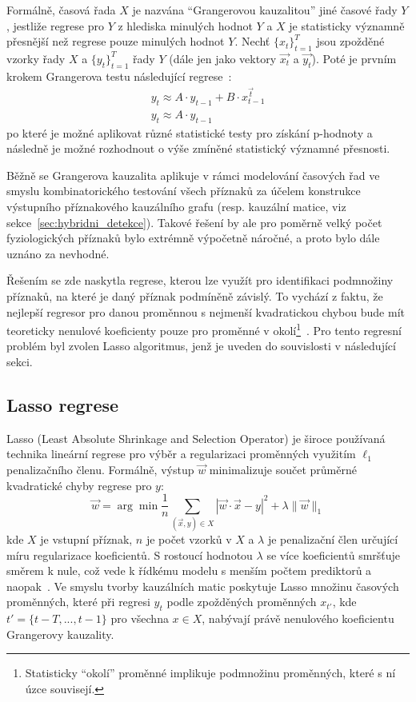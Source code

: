 Formálně, časová řada $X$ je nazvána \enquote{Grangerovou kauzalitou} jiné
časové řady $Y$, jestliže regrese pro $Y$ z hlediska minulých hodnot $Y$ a $X$
je statisticky významně přesnější než regrese pouze minulých hodnot $Y$. Nechť
$\{x_t\}_{t=1}^T$ jsou zpožděné vzorky řady $X$ a $\{y_t\}_{t=1}^T$
řady $Y$ (dále jen jako vektory $\overrightarrow{x_t}$ a $\overrightarrow{y_t}$).
Poté je prvním krokem Grangerova testu následující regrese~\cite{Arnold2007}:
\begin{equation}
    \begin{gathered}
        y_t \approx A \cdot y_{t-1}+B \cdot x_{t-1}^{\vec{t}} \\
        y_t \approx A \cdot y_{t-1}
    \end{gathered}
\end{equation}
po které je možné aplikovat různé statistické testy pro získání p-hodnoty a
následně je možné rozhodnout o výše zmíněné statistický významné přesnosti.

Běžně se Grangerova kauzalita aplikuje v rámci modelování časových řad ve smyslu
kombinatorického testování všech příznaků za účelem konstrukce výstupního
příznakového kauzálního grafu (resp. kauzální matice, viz
sekce~\ref{sec:hybridni_detekce}). Takové řešení by ale pro poměrně velký počet
fyziologických příznaků bylo extrémně výpočetně náročné, a proto bylo dále
uznáno za nevhodné.

Řešením se zde naskytla regrese, kterou lze využít pro identifikaci podmnožiny
příznaků, na které je daný příznak podmíněně závislý. To vychází z faktu, že
nejlepší regresor pro danou proměnnou s nejmenší kvadratickou chybou bude mít
teoreticky nenulové koeficienty pouze pro proměnné v okolí\footnote{Statisticky
    \enquote{okolí} proměnné implikuje podmnožinu proměnných, které s ní úzce
    souvisejí.}~\cite{Schindler2013,Arnold2007}. Pro tento regresní problém byl
zvolen Lasso algoritmus, jenž je uveden do souvislosti v následující sekci.

\subsection{Lasso regrese}
\label{subsec:lasso}
\gls{Lasso} (Least Absolute Shrinkage and Selection Operator) je široce
používaná technika lineární regrese pro výběr a regularizaci proměnných využitím
$\ell_1$ penalizačního členu. Formálně, výstup $\vec{w}$ minimalizuje součet
průměrné kvadratické chyby regrese pro $y$:
\begin{equation}
    \vec{w}=\arg \min \frac{1}{n} \sum_{(\vec{x}, y) \in X}|\vec{w} \cdot \vec{x}-y|^2+\lambda\|\vec{w}\|_1
\end{equation}
kde $X$ je vstupní příznak, $n$ je počet vzorků v $X$ a $\lambda$ je penalizační
člen určující míru regularizace koeficientů. S rostoucí hodnotou $\lambda$ se
více koeficientů smršťuje směrem k nule, což vede k řídkému modelu s menším
počtem prediktorů a naopak~\cite{Tibshirani1996}. Ve smyslu tvorby kauzálních
matic poskytuje Lasso množinu časových proměnných, které při regresi $y_t$ podle
zpožděných proměnných $x_{t'}$, kde $t'=\{t-T,...,t -1\}$ pro všechna $x \in X$,
nabývají právě nenulového koeficientu Grangerovy kauzality.

